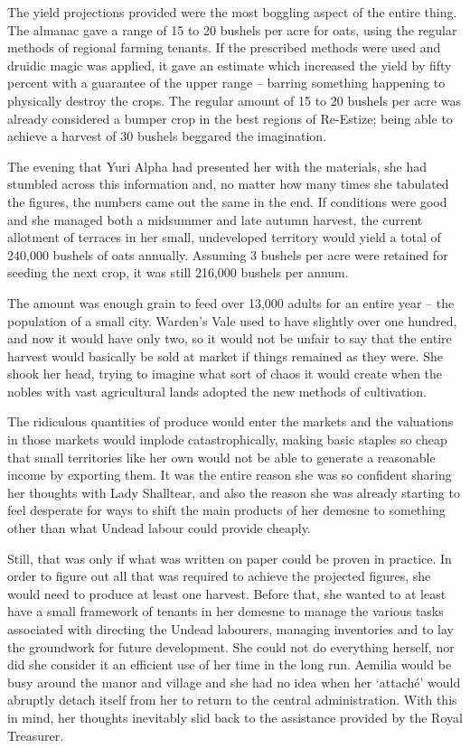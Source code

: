 

The yield projections provided were the most boggling aspect of the entire thing. The almanac gave a range of 15 to 20 bushels per acre for oats, using the regular methods of regional farming tenants. If the prescribed methods were used and druidic magic was applied, it gave an estimate which increased the yield by fifty percent with a guarantee of the upper range – barring something happening to physically destroy the crops. The regular amount of 15 to 20 bushels per acre was already considered a bumper crop in the best regions of Re-Estize; being able to achieve a harvest of 30 bushels beggared the imagination.

 

The evening that Yuri Alpha had presented her with the materials, she had stumbled across this information and, no matter how many times she tabulated the figures, the numbers came out the same in the end. If conditions were good and she managed both a midsummer and late autumn harvest, the current allotment of terraces in her small, undeveloped territory would yield a total of 240,000 bushels of oats annually. Assuming 3 bushels per acre were retained for seeding the next crop, it was still 216,000 bushels per annum.

 

The amount was enough grain to feed over 13,000 adults for an entire year – the population of a small city. Warden’s Vale used to have slightly over one hundred, and now it would have only two, so it would not be unfair to say that the entire harvest would basically be sold at market if things remained as they were. She shook her head, trying to imagine what sort of chaos it would create when the nobles with vast agricultural lands adopted the new methods of cultivation.

 

The ridiculous quantities of produce would enter the markets and the valuations in those markets would implode catastrophically, making basic staples so cheap that small territories like her own would not be able to generate a reasonable income by exporting them. It was the entire reason she was so confident sharing her thoughts with Lady Shalltear, and also the reason she was already starting to feel desperate for ways to shift the main products of her demesne to something other than what Undead labour could provide cheaply.


Still, that was only if what was written on paper could be proven in practice. In order to figure out all that was required to achieve the projected figures, she would need to produce at least one harvest. Before that, she wanted to at least have a small framework of tenants in her demesne to manage the various tasks associated with directing the Undead labourers, managing inventories and to lay the groundwork for future development. She could not do everything herself, nor did she consider it an efficient use of her time in the long run. Aemilia would be busy around the manor and village and she had no idea when her ‘attaché’ would abruptly detach itself from her to return to the central administration. With this in mind, her thoughts inevitably slid back to the assistance provided by the Royal Treasurer.